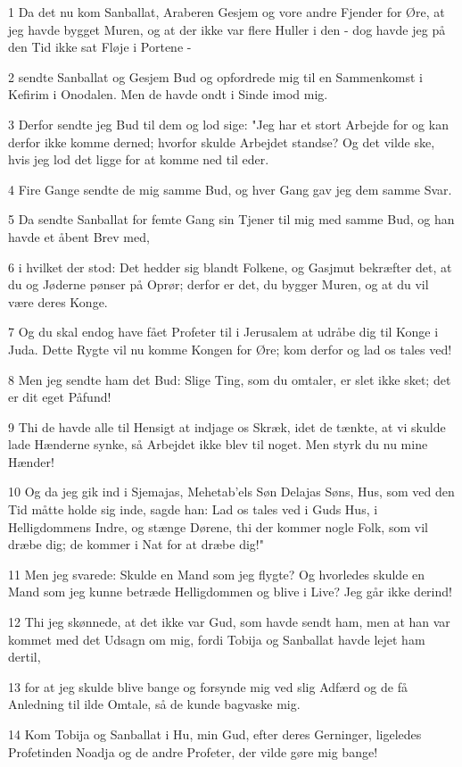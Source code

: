 \par 1 Da det nu kom Sanballat, Araberen Gesjem og vore andre Fjender for Øre, at jeg havde bygget Muren, og at der ikke var flere Huller i den - dog havde jeg på den Tid ikke sat Fløje i Portene -
\par 2 sendte Sanballat og Gesjem Bud og opfordrede mig til en Sammenkomst i Kefirim i Onodalen. Men de havde ondt i Sinde imod mig.
\par 3 Derfor sendte jeg Bud til dem og lod sige: "Jeg har et stort Arbejde for og kan derfor ikke komme derned; hvorfor skulde Arbejdet standse? Og det vilde ske, hvis jeg lod det ligge for at komme ned til eder.
\par 4 Fire Gange sendte de mig samme Bud, og hver Gang gav jeg dem samme Svar.
\par 5 Da sendte Sanballat for femte Gang sin Tjener til mig med samme Bud, og han havde et åbent Brev med,
\par 6 i hvilket der stod: Det hedder sig blandt Folkene, og Gasjmut bekræfter det, at du og Jøderne pønser på Oprør; derfor er det, du bygger Muren, og at du vil være deres Konge.
\par 7 Og du skal endog have fået Profeter til i Jerusalem at udråbe dig til Konge i Juda. Dette Rygte vil nu komme Kongen for Øre; kom derfor og lad os tales ved!
\par 8 Men jeg sendte ham det Bud: Slige Ting, som du omtaler, er slet ikke sket; det er dit eget Påfund!
\par 9 Thi de havde alle til Hensigt at indjage os Skræk, idet de tænkte, at vi skulde lade Hænderne synke, så Arbejdet ikke blev til noget. Men styrk du nu mine Hænder!
\par 10 Og da jeg gik ind i Sjemajas, Mehetab'els Søn Delajas Søns, Hus, som ved den Tid måtte holde sig inde, sagde han: Lad os tales ved i Guds Hus, i Helligdommens Indre, og stænge Dørene, thi der kommer nogle Folk, som vil dræbe dig; de kommer i Nat for at dræbe dig!"
\par 11 Men jeg svarede: Skulde en Mand som jeg flygte? Og hvorledes skulde en Mand som jeg kunne betræde Helligdommen og blive i Live? Jeg går ikke derind!
\par 12 Thi jeg skønnede, at det ikke var Gud, som havde sendt ham, men at han var kommet med det Udsagn om mig, fordi Tobija og Sanballat havde lejet ham dertil,
\par 13 for at jeg skulde blive bange og forsynde mig ved slig Adfærd og de få Anledning til ilde Omtale, så de kunde bagvaske mig.
\par 14 Kom Tobija og Sanballat i Hu, min Gud, efter deres Gerninger, ligeledes Profetinden Noadja og de andre Profeter, der vilde gøre mig bange!
